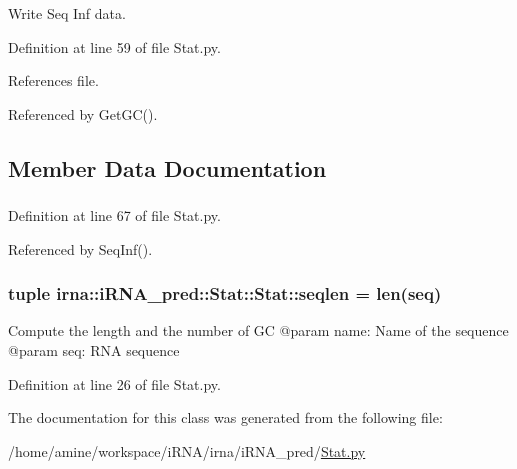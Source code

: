 \-Write \-Seq \-Inf data. 



\-Definition at line 59 of file \-Stat.\-py.



\-References file.



\-Referenced by \-Get\-G\-C().



\subsection{\-Member \-Data \-Documentation}
\hypertarget{classirna_1_1iRNA__pred_1_1Stat_1_1Stat_af13b7dc4d36c64241efaefb63f59f2fb}{
\subsubsection[{file}]{}}
\label{classirna_1_1iRNA__pred_1_1Stat_1_1Stat_af13b7dc4d36c64241efaefb63f59f2fb}


\-Definition at line 67 of file \-Stat.\-py.



\-Referenced by \-Seq\-Inf().

\hypertarget{classirna_1_1iRNA__pred_1_1Stat_1_1Stat_ad425d24b242b8e0abcbc123b36753123}{
\subsubsection[{seqlen}]{\setlength{\rightskip}{0pt plus 5cm}tuple {\bf irna\-::i\-R\-N\-A\-\_\-pred\-::\-Stat\-::\-Stat\-::seqlen} = len(seq)}}
\label{classirna_1_1iRNA__pred_1_1Stat_1_1Stat_ad425d24b242b8e0abcbc123b36753123}
\begin{DoxyVerb}
Compute the length and the number of GC
@param name: Name of the sequence
@param seq: RNA sequence
\end{DoxyVerb}
 

\-Definition at line 26 of file \-Stat.\-py.



\-The documentation for this class was generated from the following file\-:\begin{DoxyCompactItemize}
\item 
/home/amine/workspace/i\-R\-N\-A/irna/i\-R\-N\-A\-\_\-pred/\hyperlink{Stat_8py}{\-Stat.\-py}\end{DoxyCompactItemize}

